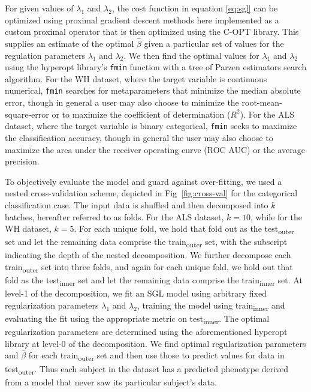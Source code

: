 For given values of $\lambda_1$ and $\lambda_2$, the cost function in equation
\ref{eq:sgl} can be optimized using proximal gradient descent methods
\cite{parikh2014proximal} here implemented as a custom proximal operator that is
then optimized using the C-OPT library\cite{copt}. This supplies an estimate
of the optimal $\widehat{\beta}$ given a particular set of values for the
regulation parameters $\lambda_1$ and $\lambda_2$. We then find the optimal
values for $\lambda_1$ and $\lambda_2$ using the hyperopt library's \verb|fmin|
function\cite{Bergstra_2015} with a tree of Parzen estimators search
algorithm\cite{bergstra2011algorithms}. For the WH dataset, where the target
variable is continuous numerical, \verb|fmin| searches for metaparameters that
minimize the median absolute error, though in general a user may also
choose to minimize the root-mean-square-error or to maximize the
coefficient of determination ($R^2$). For the ALS dataset, where the
target variable is binary categorical, \verb|fmin| seeks to maximize the
classification accuracy, though in general the user may also choose to
maximize the area under the receiver operating curve (ROC AUC) or the
average precision. 

To objectively evaluate the model and guard against over-fitting,
we used a nested cross-validation scheme, depicted in
Fig~\ref{fig:cross-val} for the categorical classification case. The
input data is shuffled and then decomposed into $k$ batches, hereafter
referred to as folds. For the ALS dataset, $k=10$, while for the WH
dataset, $k=5$. For each unique fold, we hold that fold out as the
test\textsubscript{outer} set and let the remaining data comprise
the train\textsubscript{outer} set, with the subscript indicating
the depth of the nested decomposition. We further decompose each
train\textsubscript{outer} set into three folds, and again for each
unique fold, we hold out that fold as the test\textsubscript{inner}
set and let the remaining data comprise the train\textsubscript{inner}
set. At level-1 of the decomposition, we fit an SGL model using
arbitrary fixed regularization parameters $\lambda_1$ and $\lambda_2$,
training the model using train\textsubscript{inner} and evaluating
the fit using the appropriate metric on test\textsubscript{inner}.
The optimal regularization parameters are determined using the
aforementioned hyperopt library at level-0 of the decomposition. We
find optimal regularization parameters and $\widehat{\beta}$ for each
train\textsubscript{outer} set and then use those to predict values for
data in test\textsubscript{outer}. Thus each subject in the dataset has
a predicted phenotype derived from a model that never saw its particular
subject's data.

